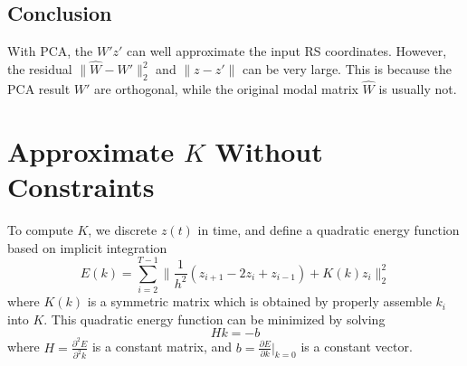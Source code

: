 \documentclass[twocolumn,a4paper]{article}
\begin{document}
\subsection{Conclusion}
With PCA, the $W'z'$ can well approximate the input RS coordinates. However, the
residual $\|\hat{W}-W'\|_2^2$ and $\|z-z'\|$ can be very large. This is because
the PCA result $W'$ are orthogonal, while the original modal matrix $\hat{W}$ is
usually not.

\section{Approximate $K$ Without Constraints}
To compute $K$, we discrete $z(t)$ in time, and define a quadratic energy
function based on implicit integration
\begin{equation} \label{qua-en}
  E(k) = \sum_{i=2}^{T-1} \|\frac{1}{h^2}(z_{i+1}-2z_{i}+z_{i-1}) + K(k)z_i\|_2^2
\end{equation}
where $K(k)$ is a symmetric matrix which is obtained by properly assemble $k_i$
into $K$. This quadratic energy function can be minimized by solving
\begin{equation} \label{sol}
  Hk = -b
\end{equation}
where $H = \frac{\partial^2{E}}{\partial^2{k}}$ is a constant matrix, and $b =
\frac{\partial{E}}{\partial{k}}|_{k=0}$ is a constant vector. 
\end{document}
